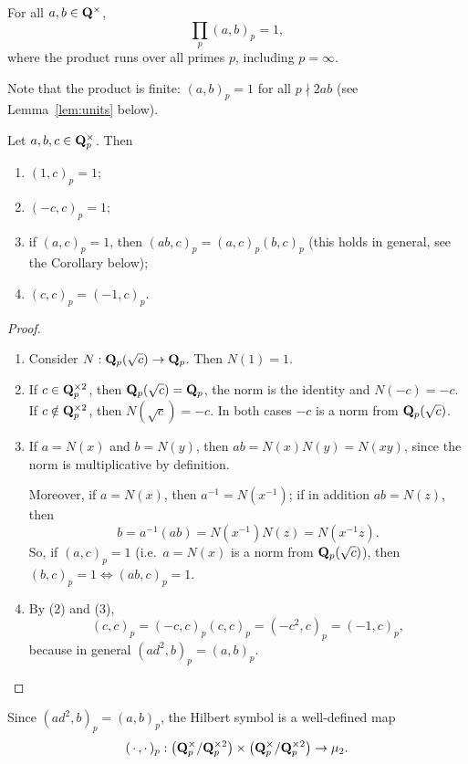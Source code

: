 \documentclass{article}
\begin{document}
\begin{thm}\label{thm:hilbertrecip}
	For all $a,b\in\mathbf{Q}^\times$,
	\[
		\prod_{p} (a,b)_p = 1,
	\]
	where the product runs over all primes $p$, including $p=\infty$.
\end{thm}
Note that the product is finite: $(a,b)_p=1$ for all $p\nmid 2ab$ (see Lemma~\ref{lem:units} below).

\begin{lem}\label{lem:basic}
	Let $a,b,c\in\mathbf{Q}_p^\times$. Then
	\begin{enumerate}
		\item $(1,c)_p = 1$;
		\item $(-c,c)_p = 1$;
		\item if $(a,c)_p = 1$, then $(ab,c)_p = (a,c)_p(b,c)_p$ (this holds in general, see the Corollary below);
		\item $(c,c)_p = (-1,c)_p$.
	\end{enumerate}
\end{lem}
\begin{proof}
	\begin{enumerate}
		\item Consider $N:\mathbf{Q}_p(\sqrt{c})\to\mathbf{Q}_p$. Then $N(1)=1$.
		\item If $c\in\mathbf{Q}_p^{\times 2}$, then $\mathbf{Q}_p(\sqrt{c})=\mathbf{Q}_p$, the norm is the identity and $N(-c)=-c$. If $c\notin\mathbf{Q}_p^{\times 2}$, then $N(\sqrt{c}) = -c$. In both cases $-c$ is a norm from $\mathbf{Q}_p(\sqrt{c})$.
		\item If $a=N(x)$ and $b=N(y)$, then $ab=N(x)N(y)=N(xy)$, since the norm is multiplicative by definition.

		      Moreover, if $a=N(x)$, then $a^{-1}=N(x^{-1})$; if in addition $ab=N(z)$, then
		      \[
			      b=a^{-1}(ab)=N(x^{-1})N(z)=N(x^{-1}z).
		      \]
		      So, if $(a,c)_p=1$ (i.e.\ $a=N(x)$ is a norm from $\mathbf{Q}_p(\sqrt{c})$), then $(b,c)_p=1\iff(ab,c)_p=1$.
		\item By (2) and (3),
		      \[
			      (c,c)_p = (-c,c)_p(c,c)_p = (-c^2,c)_p = (-1,c)_p,
		      \]
		      because in general $(ad^2,b)_p = (a,b)_p$.\qedhere
	\end{enumerate}
\end{proof}
\begin{rmk}
	Since $(ad^2,b)_p=(a,b)_p$, the Hilbert symbol is a well-defined map
	\[
		(\,\cdot\,,\cdot\,)_p : \left(\mathbf{Q}_p^\times/\mathbf{Q}_p^{\times 2}\right)\times\left(\mathbf{Q}_p^\times/\mathbf{Q}_p^{\times 2}\right)\to\mu_2.
	\]
\end{rmk}
\end{document}
